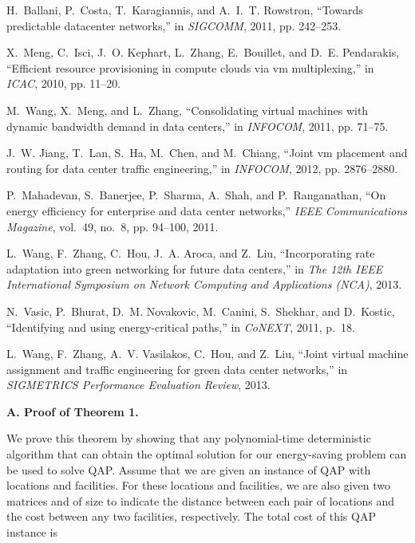 \documentclass[journal,single-space,two column,twoside,10pt]{IEEEtran}
\begin{document}
\begin{thebibliography}{1}
H.~Ballani, P.~Costa, T.~Karagiannis, and A.~I.~T. Rowstron, ``Towards
  predictable datacenter networks,'' in \emph{SIGCOMM}, 2011, pp. 242--253.

X.~Meng, C.~Isci, J.~O. Kephart, L.~Zhang, E.~Bouillet, and D.~E. Pendarakis,
  ``Efficient resource provisioning in compute clouds via vm multiplexing,'' in
  \emph{ICAC}, 2010, pp. 11--20.

M.~Wang, X.~Meng, and L.~Zhang, ``Consolidating virtual machines with dynamic
  bandwidth demand in data centers,'' in \emph{INFOCOM}, 2011, pp. 71--75.

J.~W. Jiang, T.~Lan, S.~Ha, M.~Chen, and M.~Chiang, ``Joint vm placement and
  routing for data center traffic engineering,'' in \emph{INFOCOM}, 2012, pp.
  2876--2880.

P.~Mahadevan, S.~Banerjee, P.~Sharma, A.~Shah, and P.~Ranganathan, ``On energy
  efficiency for enterprise and data center networks,'' \emph{IEEE
  Communications Magazine}, vol.~49, no.~8, pp. 94--100, 2011.

L.~Wang, F.~Zhang, C.~Hou, J.~A. Aroca, and Z.~Liu, ``Incorporating rate
  adaptation into green networking for future data centers,'' in \emph{The 12th
  IEEE International Symposium on Network Computing and Applications (NCA)},
  2013.

N.~Vasic, P.~Bhurat, D.~M. Novakovic, M.~Canini, S.~Shekhar, and D.~Kostic,
  ``Identifying and using energy-critical paths,'' in \emph{CoNEXT}, 2011,
  p.~18.

L.~Wang, F.~Zhang, A.~V. Vasilakos, C.~Hou, and Z.~Liu, ``Joint virtual machine
  assignment and traffic engineering for green data center networks,'' in
  \emph{SIGMETRICS Performance Evaluation Review}, 2013.
\end{thebibliography}

\newpage

\appendix

\noindent\textbf{A. Proof of Theorem 1.}

We prove this theorem by showing that any polynomial-time deterministic algorithm that can obtain the optimal solution for our energy-saving problem can be used to solve QAP. Assume that we are given an instance of QAP with  locations and  facilities. For these locations and facilities, we are also given two matrices  and  of size  to indicate the distance between each pair of locations and the cost between any two facilities, respectively. The total cost of this QAP instance is
\end{document}
